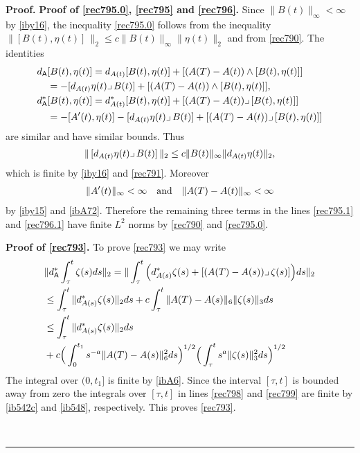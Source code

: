 \documentclass[12pt]{article}
\newenvironment{proof}[1][Proof]{\textbf{#1.} }{\ \rule{0.5em}{0.5em}}
\def \({\Big(}
\def \){\Big)}
\def \As{\mathsf{A}}
\def \eref{\eqref}
\def \lrc{\lrcorner\,}
\numberwithin{equation}{section}
\begin{document}
\begin{proof}
        {\bf Proof of  \eref{rec795.0}, \eref{rec795} and \eref{rec796}.}  
    Since  $\| B(t)\|_\infty < \infty$ by \eref{iby16},  the inequality \eref{rec795.0} follows from
    the inequality $\| [ B(t), \eta(t)]\, \|_2 \le c \|B(t)\|_\infty \| \eta(t)\|_2$ and from \eref{rec790}.
        The identities 
\begin{align}
d_\As &[B(t), \eta(t)]  =d_{A(t)} [B(t), \eta(t)] + [(A(T) - A(t)) \wedge [B(t), \eta(t)]]    \notag\\
 &= -[d_{A(t)} \eta(t) \lrc B(t)] + [(A(T) - A(t)) \wedge [B(t), \eta(t)]],                         \label{rec795.1} \\
d_\As^* &[B(t), \eta(t)] = d_{A(t)}^* [B(t), \eta(t)] +[(A(T) - A(t)) \lrc [B(t), \eta(t)] ]  \notag\\
&= -[A'(t), \eta(t)] - [d_{A(t)} \eta(t) \lrc B(t)]  +     [(A(T) - A(t)) \lrc [B(t), \eta(t)] ]         \label{rec796.1}
\end{align}
are similar  and have similar bounds. Thus
\begin{align}
\|\, [d_{A(t)} \eta(t) \lrc B(t)]\, \|_2  \le c \|B(t)\|_\infty \|d_{A(t)} \eta(t)\|_2,  \notag
\end{align}
which is finite by \eref{iby16} and \eref{rec791}. Moreover 
\begin{align}
\|A'(t)\|_\infty < \infty\ \ \ \text{and}\ \ \ \|  A(T) - A(t) \|_\infty < \infty     \notag
\end{align}
by  \eref{iby15}   and \eref{ibA72}. Therefore the remaining three terms in the lines \eref{rec795.1}
and \eref{rec796.1} have finite $L^2$ norms by \eref{rec790} and \eref{rec795.0}.


            {\bf Proof of \eref{rec793}.}  
To prove \eref{rec793} we may write
       \begin{align}
&\| d_\As^*\int_\tau^t \zeta(s) ds \|_2 
      =\| \int_\tau^t \(d_{A(s)}^*\zeta(s)  +[(A(T)- A(s))\lrc \zeta(s)]\)ds \|_2 \notag\\
&\le \int_\tau^t \|d_{A(s)}^*\zeta(s) \|_2ds  +c \int_\tau^t \| A(T) - A(s)\|_6 \|\zeta(s)\|_3    ds  \notag\\
&\le  \int_\tau^t \|d_{A(s)}^*\zeta(s) \|_2ds        \label{rec798} \\
   &+ c\(\int_0^{t_1} s^{-a}\| A(T) - A(s)\|_6^2 ds \)^{1/2} \(\int_\tau^t s^a\|\zeta(s)\|_3^2 ds \)^{1/2}  \label{rec799}
\end{align}
The  integral over $(0,t_1]$ is finite by  \eref{ibA6}. 
Since the interval $[\tau, t]$ is bounded away from zero the integrals over $[\tau, t]$ in lines \eref{rec798}
and \eref{rec799} are finite by  \eref{ib542c} and \eref{ib548}, respectively. This proves \eref{rec793}.






\end{proof}
\end{document}
